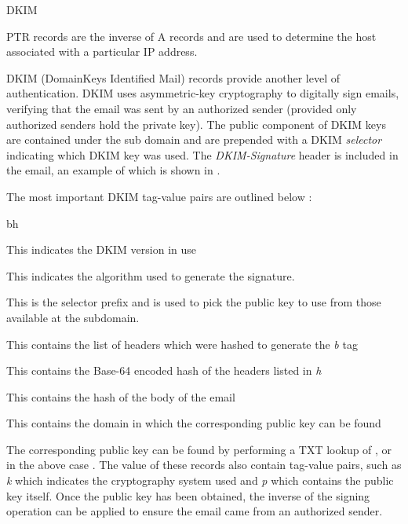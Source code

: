 \begin{labeling}{DKIM }
  \item[PTR] PTR records are the inverse of A records and are used to determine the host associated with a particular IP address. 
  \item[DKIM] DKIM (DomainKeys Identified Mail) records provide another level of authentication. DKIM uses asymmetric-key cryptography to digitally sign emails, verifying that the email was sent by an authorized sender (provided only authorized senders hold the private key). The public component of DKIM keys are contained under the  sub domain and are prepended with a DKIM \textit{selector} indicating which DKIM key was used. The \textit{DKIM-Signature} header is included in the email, an example of which is shown in .
  

  The most important DKIM tag-value pairs are outlined below \cite{dkimSig}:
  \begin{labeling}{bh }
    \item[v] This indicates the DKIM version in use
    \item[a] This indicates the algorithm used to generate the signature.
    \item[s] This is the selector prefix and is used to pick the public key to use from those available at the  subdomain.
    \item[h] This contains the list of headers which were hashed to generate the \textit{b} tag
    \item[b] This contains the Base-64 encoded hash of the headers listed in \textit{h}
    \item[bh] This contains the hash of the body of the email
    \item[d] This contains the domain in which the corresponding public key can be found
  \end{labeling}

  The corresponding public key can be found by performing a TXT lookup of , or in the above case . The value of these records also contain tag-value pairs, such as \textit{k} which indicates the cryptography system used and \textit{p} which contains the public key itself. Once the public key has been obtained, the inverse of the signing operation can be applied to ensure the email came from an authorized sender.
\end{labeling}


